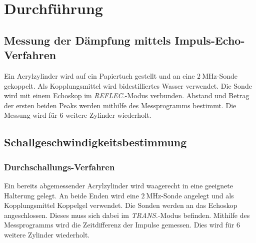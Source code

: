 \section{Durchführung}
\label{sec:Durchführung}


\subsection{Messung der Dämpfung mittels Impuls-Echo-Verfahren}
Ein Acrylzylinder wird auf ein Papiertuch gestellt und an eine $\SI{2}{\mega\hertz}$-Sonde gekoppelt. Als Kopplungsmittel wird bidestilliertes Wasser verwendet.
Die Sonde wird mit einem  Echoskop im \textit{REFLEC.}-Modus verbunden. Abstand und Betrag der ersten beiden Peaks werden mithilfe des Messprogramms bestimmt.
Die Messung wird für $6$ weitere Zylinder wiederholt.

\subsection{Schallgeschwindigkeitsbestimmung}
\subsubsection{Durchschallungs-Verfahren}
Ein bereits abgemessender Acrylzylinder wird waagerecht in eine geeignete Halterung gelegt.
An beide Enden wird eine $\SI{2}{\mega\hertz}$-Sonde angelegt und als Kopplungsmittel Koppelgel verwendet.
Die Sonden werden an das Echoskop angeschlossen. Dieses muss sich dabei im \textit{TRANS.}-Modus befinden. Mithilfe des Messprogramms wird die Zeitdifferenz der Impulse gemessen.
Dies wird für $6$ weitere Zylinder wiederholt.
